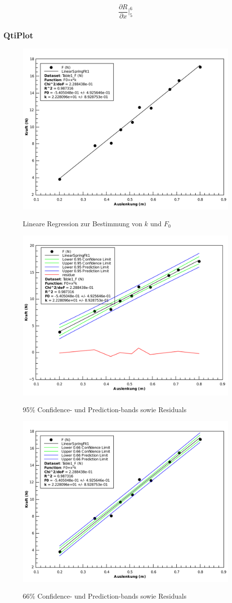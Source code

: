 \[ \frac{\partial R}{\partial x} \biggr \rvert_{5}^{6} \]


\subsubsection*{QtiPlot}

\begin{figure}[h!]
    \center
    \caption{Lineare Regression zur Bestimmung von $k$ und $F_0$}
    \includegraphics[width=.7\textwidth]{qtiplot/feder-linear}
    \label{fig:feder-linear}
\end{figure}

\begin{figure}[h!]
    \center
    \caption{95\% Confidence- und Prediction-bands sowie Residuals}
    \includegraphics[width=.7\textwidth]{qtiplot/feder-95-bands}
    \label{fig:feder-95-bands}
\end{figure}

\begin{figure}[h!]
    \center
    \caption{66\% Confidence- und Prediction-bands sowie Residuals}
    \includegraphics[width=.7\textwidth]{qtiplot/feder-66-bands}
    \label{fig:feder-66-bands}
\end{figure}

